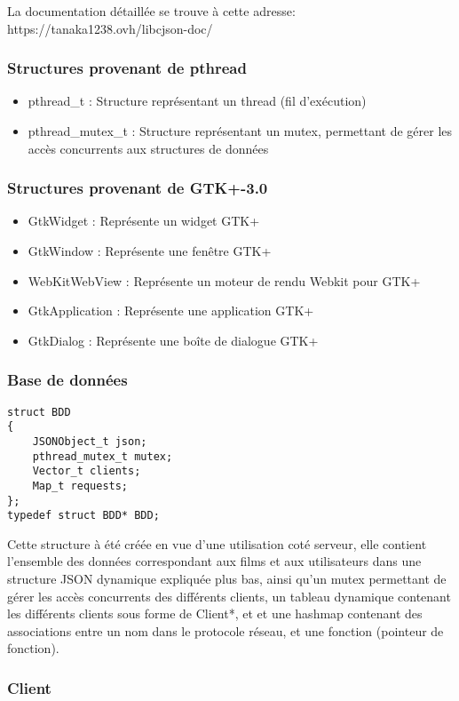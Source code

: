 La documentation détaillée se trouve à cette adresse:\newline
https://tanaka1238.ovh/libcjson-doc/

\subsubsection{Structures provenant de pthread}
\begin{itemize}
	\item pthread\_t : Structure représentant un thread (fil d'exécution)
	\item pthread\_mutex\_t : Structure représentant un mutex, permettant de gérer les accès concurrents aux structures de données
\end{itemize}
\subsubsection{Structures provenant de GTK+-3.0}
\begin{itemize}
	\item GtkWidget : Représente un widget GTK+
	\item GtkWindow : Représente une fenêtre GTK+
	\item WebKitWebView : Représente un moteur de rendu Webkit pour GTK+
	\item GtkApplication : Représente une application GTK+
	\item GtkDialog : Représente une boîte de dialogue GTK+
\end{itemize}
\subsubsection{Base de données}
\begin{lstlisting}
struct BDD
{
	JSONObject_t json;
	pthread_mutex_t mutex;
	Vector_t clients;
	Map_t requests;
};
typedef struct BDD* BDD;
\end{lstlisting}
Cette structure à été créée en vue d'une utilisation coté serveur, elle contient l'ensemble des données correspondant aux films et aux utilisateurs dans une structure JSON dynamique expliquée plus bas, ainsi qu'un mutex permettant de gérer les accès concurrents des différents clients, un tableau dynamique contenant les différents clients sous forme de Client*, et et une hashmap contenant des associations entre un nom dans le protocole réseau, et une fonction (pointeur de fonction).

\subsubsection{Client}

